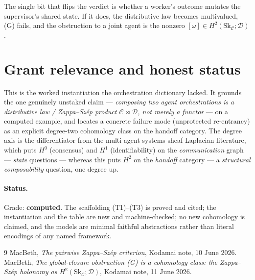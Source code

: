 \documentclass[11pt]{article}
\theoremstyle{definition}
\newcommand{\C}{\mathcal{C}}
\newcommand{\D}{\mathcal{D}}
\newcommand{\Sk}{\mathrm{Sk}}
\begin{document}
\noindent The single bit that flips the verdict is whether a worker's outcome
mutates the supervisor's shared state. If it does, the distributive law becomes
multivalued, (G) fails, and the obstruction to a joint agent is the nonzero
$[\omega]\in H^2(\Sk_\C;\D)$.

\section{Grant relevance and honest status}\label{sec:grant}

This is the worked instantiation the orchestration dictionary lacked. It grounds the
one genuinely unstaked claim --- \emph{composing two agent orchestrations is a
distributive law / Zappa--Sz\'ep product $\C\bowtie\D$, not merely a functor} --- on
a computed example, and locates a concrete failure mode (unprotected re-entrancy) as
an explicit degree-two cohomology class on the handoff category. The degree axis is
the differentiator from the multi-agent-systems sheaf-Laplacian literature, which
puts $H^0$ (consensus) and $H^1$ (identifiability) on the \emph{communication} graph
--- \emph{state} questions --- whereas this puts $H^2$ on the \emph{handoff} category
--- a \emph{structural composability} question, one degree up.

\paragraph{Status.} Grade: \textbf{computed}. The scaffolding (T1)--(T3) is proved
and cited; the instantiation and the table are new and machine-checked; no new
cohomology is claimed, and the models are minimal faithful abstractions rather than
literal encodings of any named framework.

\begin{thebibliography}{9}
 MacBeth, \emph{The pairwise Zappa--Sz\'ep criterion}, Kodamai
note, 10 June 2026.
 MacBeth, \emph{The global-closure obstruction (G) is a cohomology
class: the Zappa--Sz\'ep holonomy as $H^2(\Sk_\C;\D)$}, Kodamai note, 11 June 2026.
\end{thebibliography}
\end{document}
